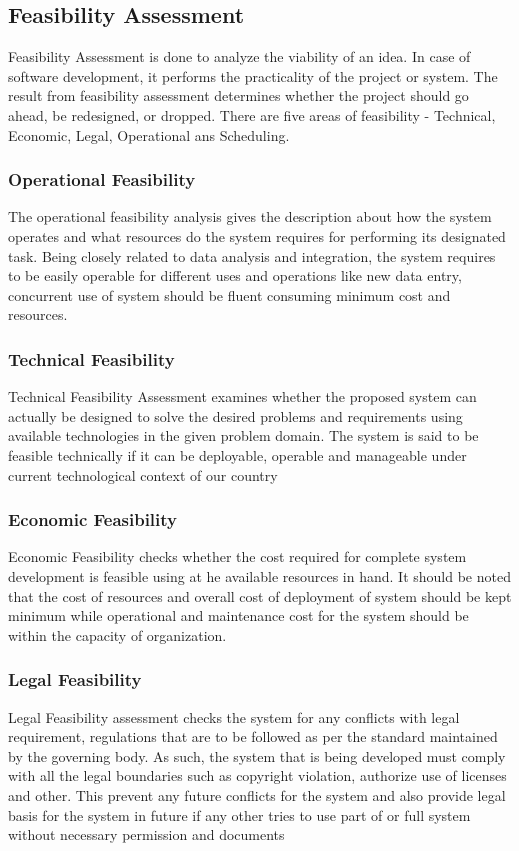 \subsection{Feasibility Assessment}
Feasibility Assessment is done to analyze the viability of an idea. In case of software development, it performs the practicality of the project or system. The result from feasibility assessment determines whether the project should go ahead, be redesigned, or dropped. There are 
five areas of feasibility - Technical, Economic, Legal, Operational ans Scheduling.

\subsubsection{Operational Feasibility}
The operational feasibility analysis gives the description about how the system operates and what resources do the system requires for performing its designated task. Being closely related to data analysis and integration, the system requires to be easily operable for different uses and operations like new data entry, concurrent use of system should be fluent consuming minimum cost and resources.

\subsubsection{Technical Feasibility}
Technical Feasibility Assessment examines whether the proposed system can actually be designed to solve the desired problems and requirements using available technologies in the given problem domain. The system is said to be feasible technically if it can be deployable, operable and manageable under current technological context of our country


\subsubsection{Economic Feasibility}
Economic Feasibility checks whether the cost required for complete system development is feasible using at he available resources in hand. It should be noted that the cost of resources and overall cost of deployment of system should be kept minimum while operational and maintenance cost for the system should be within the capacity of organization.

\subsubsection{Legal Feasibility}
Legal Feasibility assessment checks the system for any conflicts with legal requirement, regulations that are to be followed as per the standard maintained by the governing body. As such, the system that is being developed must comply with all the legal boundaries such as copyright violation, authorize use of licenses and other. This prevent any future conflicts for the system and also provide legal basis for the system in future if any other tries to use part of or full system without necessary permission and documents

